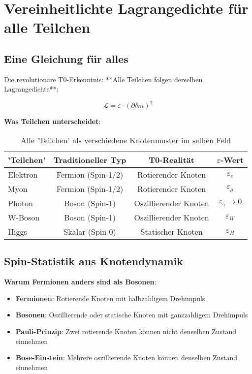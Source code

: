 \documentclass[12pt,a4paper]{article}
\newcommand{\Lag}{\mathcal{L}}
\newcommand{\deltam}{\delta m}
\theoremstyle{definition}
\theoremstyle{remark}
\begin{document}
	\section{Vereinheitlichte Lagrangedichte für alle Teilchen}
	
	\subsection{Eine Gleichung für alles}
	
	Die revolutionäre T0-Erkenntnis: **Alle Teilchen folgen derselben Lagrangedichte**:
	
	\begin{equation}
		\boxed{\Lag = \varepsilon \cdot (\partial \deltam)^2}
		\label{eq:universal_lagrangian}
	\end{equation}
	
	\textbf{Was Teilchen unterscheidet}:
	
	\begin{table}[htbp]
		\centering
		\begin{tabular}{lccc}
			\toprule
			\textbf{'Teilchen'} & \textbf{Traditioneller Typ} & \textbf{T0-Realität} & \textbf{$\varepsilon$-Wert} \\
			\midrule
			Elektron & Fermion (Spin-1/2) & Rotierender Knoten & $\varepsilon_e$ \\
			Myon & Fermion (Spin-1/2) & Rotierender Knoten & $\varepsilon_\mu$ \\
			Photon & Boson (Spin-1) & Oszillierender Knoten & $\varepsilon_\gamma \to 0$ \\
			W-Boson & Boson (Spin-1) & Oszillierender Knoten & $\varepsilon_W$ \\
			Higgs & Skalar (Spin-0) & Statischer Knoten & $\varepsilon_H$ \\
			\bottomrule
		\end{tabular}
		\caption{Alle 'Teilchen' als verschiedene Knotenmuster im selben Feld}
		\label{tab:unified_particles}
	\end{table}
	
	\subsection{Spin-Statistik aus Knotendynamik}
	
	\textbf{Warum Fermionen anders sind als Bosonen}:
	
	\begin{itemize}
		\item \textbf{Fermionen}: Rotierende Knoten mit halbzahligem Drehimpuls
		\item \textbf{Bosonen}: Oszillierende oder statische Knoten mit ganzzahligem Drehimpuls
		\item \textbf{Pauli-Prinzip}: Zwei rotierende Knoten können nicht denselben Zustand einnehmen
		\item \textbf{Bose-Einstein}: Mehrere oszillierende Knoten können denselben Zustand einnehmen
	\end{itemize}
	
\end{document}
